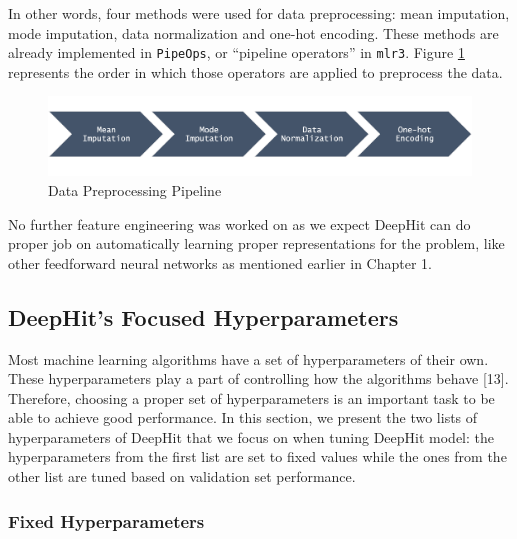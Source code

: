 \documentclass[
]{article}
\begin{document}
In other words, four methods were used for data preprocessing: mean imputation, mode imputation, data normalization and one-hot encoding. These methods are already implemented in \texttt{PipeOps}, or ``pipeline operators'' in \texttt{mlr3}. Figure \ref{fig:data-preprocessing} represents the order in which those operators are applied to preprocess the data.

\begin{figure}

{\centering \includegraphics[width=0.7\linewidth]{preprocessing} 

}

\caption{Data Preprocessing Pipeline}\label{fig:data-preprocessing}
\end{figure}

No further feature engineering was worked on as we expect DeepHit can do proper job on automatically learning proper representations for the problem, like other feedforward neural networks as mentioned earlier in Chapter 1.

\hypertarget{deephits-focused-hyperparameters}{%
\subsection{DeepHit's Focused Hyperparameters}\label{deephits-focused-hyperparameters}}

Most machine learning algorithms have a set of hyperparameters of their own. These hyperparameters play a part of controlling how the algorithms behave {[}13{]}. Therefore, choosing a proper set of hyperparameters is an important task to be able to achieve good performance. In this section, we present the two lists of hyperparameters of DeepHit that we focus on when tuning DeepHit model: the hyperparameters from the first list are set to fixed values while the ones from the other list are tuned based on validation set performance.

\hypertarget{fixed-hyperparameters}{%
\subsubsection{Fixed Hyperparameters}\label{fixed-hyperparameters}}
\end{document}
